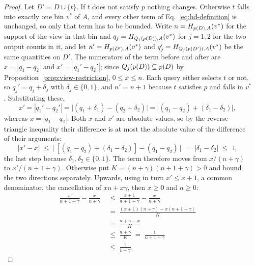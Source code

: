 \begin{proof}
Let $D'=D\cup\{t\}$.
If $t$ does not satisfy $p$ nothing changes.
Otherwise $t$ falls into exactly one bin $v^*$ of $A$, and every other term of Eq.~\eqref{eq:hd-definition} is unchanged, so only that term has to be bounded.
Write $n=H_{p(D),A}(v^*)$ for the support of the view in that bin and $q_j=H_{Q_j(p(D)),A}(v^*)$ for $j=1,2$ for the two output counts in it, and let $n'=H_{p(D'),A}(v^*)$ and $q_j'=H_{Q_j(p(D')),A}(v^*)$ be the same quantities on $D'$.
The numerators of the term before and after are $x=|q_1-q_2|$ and $x'=|q_1'-q_2'|$; since $Q_j(p(D))\subseteq p(D)$ by Proposition~\ref{prop:view-restriction}, $0\le x\le n$.
Each query either selects $t$ or not, so $q_j'=q_j+\delta_j$ with $\delta_j\in\{0,1\}$, and $n'=n+1$ because $t$ satisfies $p$ and falls in $v^*$.
Substituting these,
\[
x'=|q_1'-q_2'|=\big|(q_1+\delta_1)-(q_2+\delta_2)\big|=\big|(q_1-q_2)+(\delta_1-\delta_2)\big| ,
\]
whereas $x=|q_1-q_2|$.
Both $x$ and $x'$ are absolute values, so by the reverse triangle inequality their difference is at most the absolute value of the difference of their arguments:
\[
|x'-x|\;\le\;\big|\,[(q_1-q_2)+(\delta_1-\delta_2)]-(q_1-q_2)\,\big|\;=\;|\delta_1-\delta_2|\;\le\;1 ,
\]
the last step because $\delta_1,\delta_2\in\{0,1\}$.
The term therefore moves from $x/(n+\gamma)$ to $x'/(n+1+\gamma)$.
Otherwise put $K=(n+\gamma)(n+1+\gamma)>0$ and bound the two directions separately.
Upwards, using in turn $x'\le x+1$, a common denominator, the cancellation of $xn+x\gamma$, then $x\ge0$ and $n\ge0$:
\begin{align*}
\frac{x'}{n+1+\gamma}-\frac{x}{n+\gamma}
&\;\le\;\frac{x+1}{n+1+\gamma}-\frac{x}{n+\gamma}\\[2pt]
&\;=\;\frac{(x+1)(n+\gamma)-x(n+1+\gamma)}{K}\\[2pt]
&\;=\;\frac{n+\gamma-x}{K}\\[2pt]
&\;\le\;\frac{n+\gamma}{K}\;=\;\frac{1}{n+1+\gamma}\\[2pt]
&\;\le\;\frac{1}{1+\gamma}.

\end{align*}
\end{proof}
